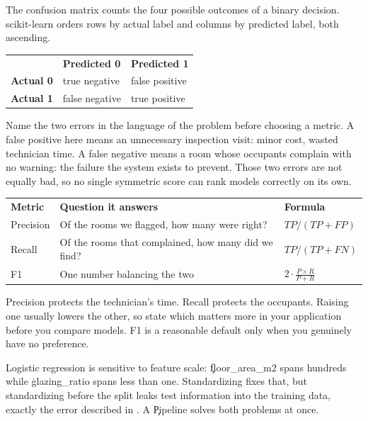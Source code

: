 
The confusion matrix counts the four possible outcomes of a binary decision.
scikit-learn orders rows by actual label and columns by predicted label, both
ascending.

\begin{center}
\begin{tabular}{lll}
 & \textbf{Predicted 0} & \textbf{Predicted 1} \\
\textbf{Actual 0} & true negative & false positive \\
\textbf{Actual 1} & false negative & true positive \\
\end{tabular}
\end{center}

Name the two errors in the language of the problem before choosing a metric. A
false positive here means an unnecessary inspection visit: minor cost, wasted
technician time. A false negative means a room whose occupants complain with no
warning: the failure the system exists to prevent. Those two errors are not
equally bad, so no single symmetric score can rank models correctly on its own.


\begin{center}
\begin{tabular}{lll}
\textbf{Metric} & \textbf{Question it answers} & \textbf{Formula} \\
Precision & Of the rooms we flagged, how many were right? & $TP / (TP + FP)$ \\
Recall & Of the rooms that complained, how many did we find? & $TP / (TP + FN)$ \\
F1 & One number balancing the two & $2 \cdot \frac{P \times R}{P+R}$ \\
\end{tabular}
\end{center}

Precision protects the technician's time. Recall protects the occupants. Raising
one usually lowers the other, so state which matters more in your application
before you compare models. F1 is a reasonable default only when you genuinely
have no preference.


Logistic regression is sensitive to feature scale: \c{floor_area_m2} spans
hundreds while \c{glazing_ratio} spans less than one. Standardizing fixes that,
but standardizing before the split leaks test information into the training
data, exactly the error described in . A
\c{Pipeline} solves both problems at once.

